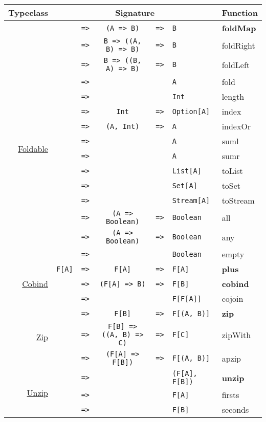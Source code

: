 \documentclass{tufte-handout}
\newcommand{\fa}{F[A]}
\newcommand{\fb}{F[B]}
\newcommand{\rarr}{\texttt{=>}}
\newcommand{\fTwo}[2]{\texttt{#1} & \rarr & & & \texttt{#2}}
\newcommand{\fThree}[3]{\texttt{#1} & \rarr & \texttt{#2} & \rarr & \texttt{#3}}
\newcommand{\sdocUrl}[1]{http://docs.typelevel.org/api/scalaz/stable/7.0.4/doc/\#scalaz.#1}
\newcommand{\sdocHref}[1]{\href{\sdocUrl{#1}}{#1}}
\begin{document}
\begin{table}[ht]
  \centering
  \selectfont
  \begin{tabular}{rrcclll}
    Typeclass & \multicolumn{5}{c}{Signature} & Function \\
    \midrule
    \multirow{16}{*}{\sdocHref{Foldable}}
      & \fThree{\multirow{16}{*}{\fa}}{(A => B)}{B} & \textbf{foldMap} \\
      & \fThree{}{B => ((A, B) => B)}{B} & foldRight \\
      & \fThree{}{B => ((B, A) => B)}{B} & foldLeft \\
      & \fTwo{}{A} & fold \\
      & \fTwo{}{Int} & length \\
      & \fThree{}{Int}{Option[A]} & index \\
      & \fThree{}{(A, Int)}{A} & indexOr \\
      & \fTwo{}{A} & suml \\
      & \fTwo{}{A} & sumr \\
      & \fTwo{}{List[A]} & toList \\
      & \fTwo{}{Set[A]} & toSet \\
      & \fTwo{}{Stream[A]} & toStream \\
      & \fThree{}{(A => Boolean)}{Boolean} & all \\
      & \fThree{}{(A => Boolean)}{Boolean} & any \\
      & \fTwo{}{Boolean} & empty \\[.5cm]
    \sdocHref{Plus}
      & \fThree{\fa}{\fa}{\fa} & \textbf{plus} \\[.5cm]
    \sdocHref{Cobind}
      & \fThree{\multirow{2}{*}{\fa}}{(F[A] => B)}{\fb} & \textbf{cobind} \\
      & \fTwo{}{F[\fa]} & cojoin \\[.5cm]
    \multirow{3}{*}{\sdocHref{Zip}}
      & \fThree{\multirow{3}{*}{\fa}}{\fb}{F[(A, B)]} & \textbf{zip} \\
      & \fThree{}{F[B] => ((A, B) => C)}{F[C]} & zipWith \\
      & \fThree{}{(F[A] => F[B])}{F[(A, B)]} & apzip \\[.5cm]
    \multirow{3}{*}{\sdocHref{Unzip}}
      & \fTwo{\multirow{3}{*}{F[(A, B)]}}{(\fa, \fb)} & \textbf{unzip} \\
      & \fTwo{}{\fa} & firsts \\
      & \fTwo{}{\fb} & seconds \\[.5cm]
  \end{tabular}
\end{table}




\end{document}
